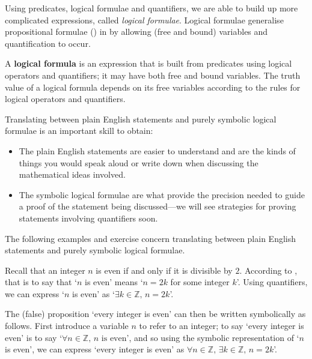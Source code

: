 Using predicates, logical formulae and quantifiers, we are able to build up more complicated expressions, called \textit{logical formulae}. Logical formulae generalise propositional formulae () in by allowing (free and bound) variables and quantification to occur.

\begin{definition}
\label{defLogicalFormula}
A \textbf{logical formula} is an expression that is built from predicates using logical operators and quantifiers; it may have both free and bound variables. The truth value of a logical formula depends on its free variables according to the rules for logical operators and quantifiers.
\end{definition}

Translating between plain English statements and purely symbolic logical formulae is an important skill to obtain:
\begin{itemize}
\item The plain English statements are easier to understand and are the kinds of things you would speak aloud or write down when discussing the mathematical ideas involved.
\item The symbolic logical formulae are what provide the precision needed to guide a proof of the statement being discussed---we will see strategies for proving statements involving quantifiers soon.
\end{itemize}

The following examples and exercise concern translating between plain English statements and purely symbolic logical formulae.

\begin{example}
Recall that an integer $n$ is even if and only if it is divisible by $2$. According to , that is to say that `$n$ is even' means `$n=2k$ for some integer $k$'. Using quantifiers, we can express `$n$ is even' as `$\exists k \in \mathbb{Z},\, n=2k$'.

The (false) proposition `every integer is even' can then be written symbolically as follows. First introduce a variable $n$ to refer to an integer; to say `every integer is even' is to say `$\forall n \in \mathbb{Z},\, n \text{ is even}$', and so using the symbolic representation of `$n$ is even', we can express `every integer is even' as $\forall n \in \mathbb{Z},\, \exists k \in \mathbb{Z},\, n=2k$'.
\end{example}

